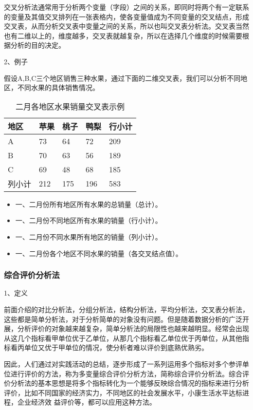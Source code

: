 交叉分析法通常用于分析两个变量（字段）之间的关系，即同时将两个有一定联系的变量及其值交叉排列在一张表格内，使各变量值成为不同变量的交叉结点，形成交叉表，从而分析交叉表中变量之间的关系，所以也叫交叉表分析法。交叉表当然也有二维以上的，维度越多，交叉表就越复杂，所以在选择几个维度的时候需要根据分析的目的决定。

2、例子

假设A,B,C三个地区销售三种水果，通过下面的二维交叉表，我们可以分析不同地区，不同水果的具体销售情况。
\begin{table}[]
\centering
\caption{二月各地区水果销量交叉表示例}
\begin{tabular}{|l|l|l|l|l|}
\hline
地区  & 苹果  & 桃子                        & 鸭梨  & 行小计 \\ \hline
A   & 73  & {\color[HTML]{333333} 64} & 72  & 209 \\ \hline
B   & 70  & 63                        & 56  & 189 \\ \hline
C   & 69  & 48                        & 68  & 185 \\ \hline
列小计 & 212 & 175                       & 196 & 583 \\ \hline
\end{tabular}
\end{table}

\begin{itemize}
    \item 一、二月份所有地区所有水果的总销量（总计）。
    \item 一、二月份不同地区所有水果的销量（行小计）。
    \item 一、二月份不同水果所有地区的销量（列小计）。
    \item 一、二月份各个地区不同水果的销量（各交叉结点值）。
\end{itemize}

\subsubsection{综合评价分析法}

1、定义

前面介绍的对比分析法，分组分析法，结构分析法，平均分析法，交叉表分析法，这些都是简单分析法，对于分析简单的对象没有问题。但是随着数据分析的广泛开展，分析评价的对象越来越复杂，简单分析法的局限性也越来越明显。经常会出现从这几个指标看甲单位优于乙单位，从那几个指标看乙单位优于丙单位，从其他指标看丙单位又优于甲单位的情况，使分析者难以评价到底熟优熟劣。

因此，人们通过对实践活动的总结，逐步形成了一系列运用多个指标对多个参评单位进行评价的方法，称为多变量综合评价分析方法，简称综合评价分析法。综合评价分析法的基本思想是将多个指标转化为一个能够反映综合情况的指标来进行分析评价，比如不同国家的经济实力，不同地区的社会发展水平，小康生活水平达标进程，企业经济效
益评价等，都可以应用这种方法。

